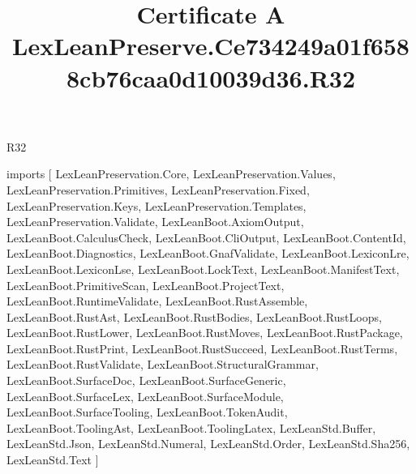 \begin{lexlean}{R32}
\title{Certificate A LexLeanPreserve.Ce734249a01f6588cb76caa0d10039d36.R32}
\begin{coremodule}
imports [
  LexLeanPreservation.Core,
  LexLeanPreservation.Values,
  LexLeanPreservation.Primitives,
  LexLeanPreservation.Fixed,
  LexLeanPreservation.Keys,
  LexLeanPreservation.Templates,
  LexLeanPreservation.Validate,
  LexLeanBoot.AxiomOutput,
  LexLeanBoot.CalculusCheck,
  LexLeanBoot.CliOutput,
  LexLeanBoot.ContentId,
  LexLeanBoot.Diagnostics,
  LexLeanBoot.GnafValidate,
  LexLeanBoot.LexiconLre,
  LexLeanBoot.LexiconLse,
  LexLeanBoot.LockText,
  LexLeanBoot.ManifestText,
  LexLeanBoot.PrimitiveScan,
  LexLeanBoot.ProjectText,
  LexLeanBoot.RuntimeValidate,
  LexLeanBoot.RustAssemble,
  LexLeanBoot.RustAst,
  LexLeanBoot.RustBodies,
  LexLeanBoot.RustLoops,
  LexLeanBoot.RustLower,
  LexLeanBoot.RustMoves,
  LexLeanBoot.RustPackage,
  LexLeanBoot.RustPrint,
  LexLeanBoot.RustSucceed,
  LexLeanBoot.RustTerms,
  LexLeanBoot.RustValidate,
  LexLeanBoot.StructuralGrammar,
  LexLeanBoot.SurfaceDoc,
  LexLeanBoot.SurfaceGeneric,
  LexLeanBoot.SurfaceLex,
  LexLeanBoot.SurfaceModule,
  LexLeanBoot.SurfaceTooling,
  LexLeanBoot.TokenAudit,
  LexLeanBoot.ToolingAst,
  LexLeanBoot.ToolingLatex,
  LexLeanStd.Buffer,
  LexLeanStd.Json,
  LexLeanStd.Numeral,
  LexLeanStd.Order,
  LexLeanStd.Sha256,
  LexLeanStd.Text
]


\end{coremodule}
\end{lexlean}
